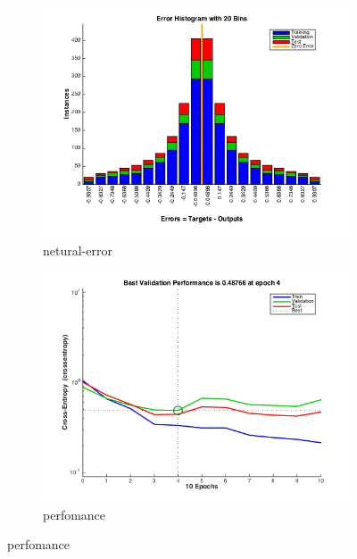 \documentclass[]{article}
\begin{document}
\begin{figure}[h]
	\centering
	\begin{subfigure}{.49\textwidth}
		\centering
		\includegraphics[width=1\linewidth]{../images-update/1-(4)-netural-error.png}
		\caption{netural-error}
		\label{fig:sub1}
	\end{subfigure}
	\begin{subfigure}{.49\textwidth}
		\centering
		\includegraphics[width=1\linewidth]{../images-update/1-(4)-neural-perfomance.png}
		\caption{perfomance}
		\label{fig:sub1}
	\end{subfigure}
	

\end{figure}
\end{document}
